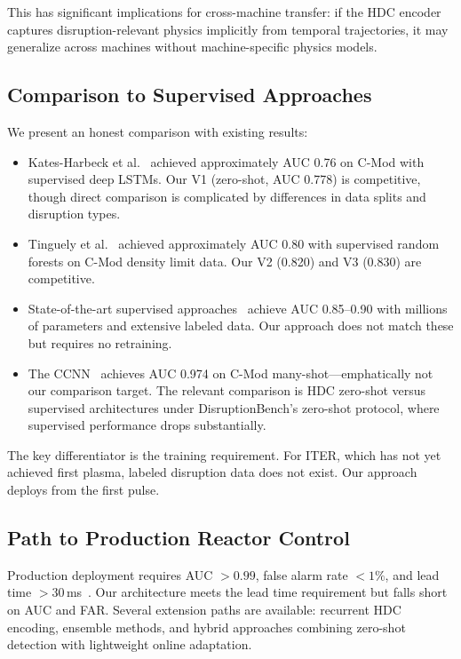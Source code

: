 \documentclass[twocolumn,prl,aps,superscriptaddress,floatfix]{revtex4-2}
\begin{document}
This has significant implications for cross-machine transfer: if the HDC encoder captures disruption-relevant physics implicitly from temporal trajectories, it may generalize across machines without machine-specific physics models.

\subsection{Comparison to Supervised Approaches}

We present an honest comparison with existing results:

\begin{itemize}
\item Kates-Harbeck et al.~\cite{KatesHarbeck2019} achieved approximately AUC 0.76 on C-Mod with supervised deep LSTMs. Our V1 (zero-shot, AUC 0.778) is competitive, though direct comparison is complicated by differences in data splits and disruption types.

\item Tinguely et al.~\cite{Tinguely2019} achieved approximately AUC 0.80 with supervised random forests on C-Mod density limit data. Our V2 (0.820) and V3 (0.830) are competitive.

\item State-of-the-art supervised approaches~\cite{Montvai2023,Churchill2020} achieve AUC 0.85--0.90 with millions of parameters and extensive labeled data. Our approach does not match these but requires no retraining.

\item The CCNN~\cite{Arnold2023} achieves AUC 0.974 on C-Mod many-shot---emphatically not our comparison target. The relevant comparison is HDC zero-shot versus supervised architectures under DisruptionBench's zero-shot protocol, where supervised performance drops substantially.
\end{itemize}

The key differentiator is the training requirement. For ITER, which has not yet achieved first plasma, labeled disruption data does not exist. Our approach deploys from the first pulse.

\subsection{Path to Production Reactor Control}

Production deployment requires AUC $> 0.99$, false alarm rate $< 1\%$, and lead time $> 30$\,ms~\cite{Strait2019,ITER2018}. Our architecture meets the lead time requirement but falls short on AUC and FAR. Several extension paths are available: recurrent HDC encoding, ensemble methods, and hybrid approaches combining zero-shot detection with lightweight online adaptation.
\end{document}
